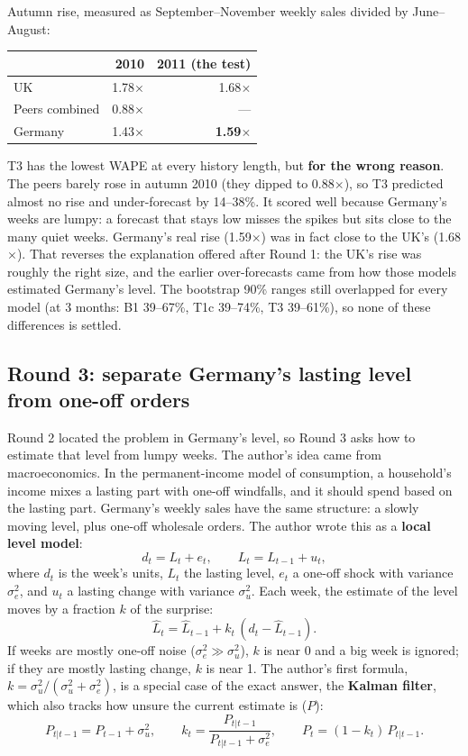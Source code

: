 \documentclass[11pt]{article}
\newcommand{\best}[1]{\textbf{#1}}
\begin{document}
Autumn rise, measured as September--November weekly sales divided by June--August:

\begin{center}
\begin{tabular}{l r r}
\toprule
 & 2010 & 2011 (the test) \\
\midrule
UK & 1.78$\times$ & 1.68$\times$ \\
Peers combined & 0.88$\times$ & --- \\
Germany & 1.43$\times$ & \best{1.59$\times$} \\
\bottomrule
\end{tabular}
\end{center}

T3 has the lowest WAPE at every history length, but \textbf{for the wrong reason}. The peers barely rose
in autumn 2010 (they dipped to 0.88$\times$), so T3 predicted almost no rise and under-forecast by
14--38\%. It scored well because Germany's weeks are lumpy: a forecast that stays low misses the spikes
but sits close to the many quiet weeks. Germany's real rise (1.59$\times$) was in fact close to the UK's
(1.68$\times$). That reverses the explanation offered after Round 1: the UK's rise was roughly the right
size, and the earlier over-forecasts came from how those models estimated Germany's level. The bootstrap
90\% ranges still overlapped for every model (at 3 months: B1 39--67\%, T1c 39--74\%, T3 39--61\%), so
none of these differences is settled.

\subsection*{Round 3: separate Germany's lasting level from one-off orders}

Round 2 located the problem in Germany's level, so Round 3 asks how to estimate that level from lumpy
weeks. The author's idea came from macroeconomics. In the permanent-income model of consumption, a
household's income mixes a lasting part with one-off windfalls, and it should spend based on the lasting
part. Germany's weekly sales have the same structure: a slowly moving level, plus one-off wholesale orders.
The author wrote this as a \textbf{local level model}:
\[
d_t = L_t + e_t, \qquad L_t = L_{t-1} + u_t,
\]
where $d_t$ is the week's units, $L_t$ the lasting level, $e_t$ a one-off shock with variance $\sigma_e^2$,
and $u_t$ a lasting change with variance $\sigma_u^2$. Each week, the estimate of the level moves by a
fraction $k$ of the surprise:
\[
\hat L_t = \hat L_{t-1} + k_t\,(d_t - \hat L_{t-1}).
\]
If weeks are mostly one-off noise ($\sigma_e^2 \gg \sigma_u^2$), $k$ is near 0 and a big week is ignored;
if they are mostly lasting change, $k$ is near 1. The author's first formula, $k = \sigma_u^2/(\sigma_u^2 +
\sigma_e^2)$, is a special case of the exact answer, the \textbf{Kalman filter}, which also tracks how unsure
the current estimate is ($P$):
\[
P_{t|t-1} = P_{t-1} + \sigma_u^2, \qquad
k_t = \frac{P_{t|t-1}}{P_{t|t-1} + \sigma_e^2}, \qquad
P_t = (1 - k_t)\,P_{t|t-1}.
\]
\end{document}
